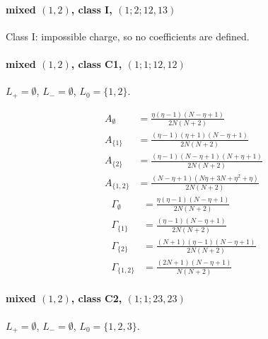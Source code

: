 \documentclass[11pt]{article}
\begin{document}
\paragraph{mixed $(1,2)$, class I, $(1;2;12,13)$}
Class I: impossible charge, so no coefficients are defined.


\paragraph{mixed $(1,2)$, class C1, $(1;1;12,12)$}

$L_+=\emptyset$, $L_-=\emptyset$, $L_0=\{1,2\}$.

\begin{align*}
  A_{\emptyset} &= \frac{\eta \left(\eta - 1\right) \left(N - \eta + 1\right)}{2 N \left(N + 2\right)} \\
  A_{\{1\}} &= \frac{\left(\eta - 1\right) \left(\eta + 1\right) \left(N - \eta + 1\right)}{2 N \left(N + 2\right)} \\
  A_{\{2\}} &= \frac{\left(\eta - 1\right) \left(N - \eta + 1\right) \left(N + \eta + 1\right)}{2 N \left(N + 2\right)} \\
  A_{\{1,2\}} &= \frac{\left(N - \eta + 1\right) \left(N \eta + 3 N + \eta^{2} + \eta\right)}{2 N \left(N + 2\right)} 
\end{align*}
\begin{align*}
  \Gamma_{\emptyset} &= \frac{\eta \left(\eta - 1\right) \left(N - \eta + 1\right)}{2 N \left(N + 2\right)} \\
  \Gamma_{\{1\}} &= \frac{\left(\eta - 1\right) \left(N - \eta + 1\right)}{2 N \left(N + 2\right)} \\
  \Gamma_{\{2\}} &= \frac{\left(N + 1\right) \left(\eta - 1\right) \left(N - \eta + 1\right)}{2 N \left(N + 2\right)} \\
  \Gamma_{\{1,2\}} &= \frac{\left(2 N + 1\right) \left(N - \eta + 1\right)}{N \left(N + 2\right)} 
\end{align*}

\paragraph{mixed $(1,2)$, class C2, $(1;1;23,23)$}

$L_+=\emptyset$, $L_-=\emptyset$, $L_0=\{1,2,3\}$.
\end{document}
